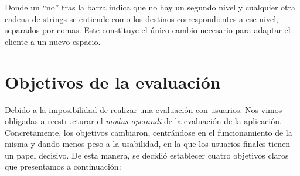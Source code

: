  



Donde un ``no'' tras la barra indica que no hay un segundo nivel y cualquier otra cadena de strings se entiende como los destinos correspondientes a ese nivel, separados por comas. Este constituye el único cambio necesario para adaptar el cliente a un nuevo espacio.

\section{Objetivos de la evaluación}
\label{sec:objetivosEval}

Debido a la imposibilidad de realizar una evaluación con usuarios. Nos vimos obligadas a reestructurar el \textit{modus operandi} de la evaluación de la aplicación. Concretamente, los objetivos cambiaron, centrándose en el funcionamiento de la misma y dando menos peso a la usabilidad, en la que los usuarios finales tienen un papel decisivo. De esta manera, se decidió establecer cuatro objetivos claros que presentamos a continuación:

